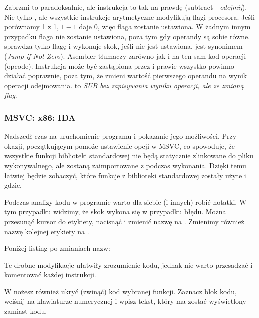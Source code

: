 \label{CMPandSUB}
Zabrzmi to paradoksalnie, ale instrukcja \CMP to tak na prawdę \SUB (subtract - \emph{odejmij}).
Nie tylko \CMP, ale wszystkie instrukcje arytmetyczne modyfikują flagi procesora.
Jeśli porównamy 1 z 1, $1-1$ daje 0, więc flaga \ZF zostanie ustawiona.
W żadnym innym przypadku flaga \ZF nie zostanie ustawiona, poza tym gdy operandy są sobie równe.
\JNE sprawdza tylko flagę \ZF i wykonuje skok, jeśli nie jest ustawiona. \JNE jest synonimem \JNZ (\emph{Jump if Not Zero}).
Asembler tłumaczy zarówno \JNE jak i \JNZ na ten sam kod operacji (opcode).
Instrukcja \CMP może być zastąpiona przez \SUB i prawie wszystko powinno działać poprawnie, poza tym, że \SUB zmieni wartość pierwszego operandu na wynik operacji odejmowania.
\CMP to \emph{SUB bez zapisywania wyniku operacji, ale ze zmianą flag}.

\subsubsection{MSVC: x86: IDA}

Nadszedł czas na uruchomienie programu \IDA i pokazanie jego możliwości.
Przy okazji, początkującym pomoże ustawienie opcji  w MSVC, co spowoduje, że wszystkie
funkcji biblioteki standardowej nie będą statycznie zlinkowane do pliku wykonywalnego,
ale zostaną zaimportowane z  podczas wykonania.
Dzięki temu łatwiej będzie zobaczyć, które funkcje z biblioteki standardowej zostały użyte i gdzie.

Podczas analizy kodu w programie \IDA warto dla siebie (i innych) robić notatki.
W tym przypadku widzimy, że skok  wykona się w przypadku błędu.
Można przesunąć kursor do etykiety, nacisnąć  i zmienić nazwę na .
Zmienimy również nazwę kolejnej etykiety na .

Poniżej listing po zmianiach nazw:



Te drobne modyfikacje ułatwiły zrozumienie kodu, jednak nie warto przesadzać i komentować każdej instrukcji.

W \IDA nożesz również ukryć (zwinąć) kod wybranej funkcji.
Zaznacz blok kodu, wciśnij  na klawiaturze numerycznej i wpisz tekst, który ma
zostać wyświetlony zamiast kodu.

